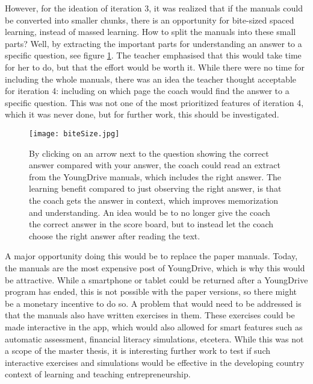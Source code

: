However, for the ideation of iteration 3, it was realized that if the manuals could be converted into smaller chunks, there is an opportunity for bite-sized spaced learning, instead of massed learning. How to split the manuals into these small parts? Well, by extracting the important parts for understanding an answer to a specific question, see figure \ref{fig:bite-size}. The teacher emphasised that this would take time for her to do, but that the effort would be worth it. While there were no time for including the whole manuals, there was an idea the teacher thought acceptable for iteration 4: including on which page the coach would find the answer to a specific question. This was not one of the most prioritized features of iteration 4, which it was never done, but for further work, this should be investigated.

\begin{figure}[h]
    \centering
    \texttt{[image: biteSize.jpg]}
    \caption{By clicking on an arrow next to the question showing the correct answer compared with your answer, the coach could read an extract from the YoungDrive manuals, which includes the right answer. The learning benefit compared to just observing the right answer, is that the coach gets the answer in context, which improves memorization and understanding. An idea would be to no longer give the coach the correct answer in the score board, but to instead let the coach choose the right answer after reading the text.}
    \label{fig:bite-size}
\end{figure}

A major opportunity doing this would be to replace the paper manuals. Today, the manuals are the most expensive post of YoungDrive, which is why this would be attractive. While a smartphone or tablet could be returned after a YoungDrive program has ended, this is not possible with the paper versions, so there might be a monetary incentive to do so. A problem that would need to be addressed is that the manuals also have written exercises in them. These exercises could be made interactive in the app, which would also allowed for smart features such as automatic assessment, financial literacy simulations, etcetera. While this was not a scope of the master thesis, it is interesting further work to test if such interactive exercises and simulations would be effective in the developing country context of learning and teaching entrepreneurship.
